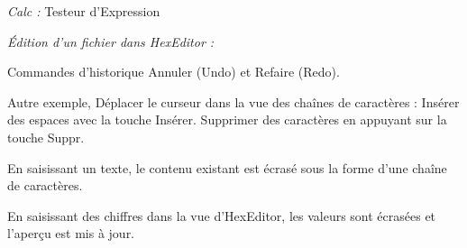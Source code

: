 \textit{Calc :}
Testeur d'Expression

\textit{Édition d'un fichier dans HexEditor :}

Commandes d'historique Annuler (Undo) et Refaire (Redo).

Autre exemple, Déplacer le curseur dans la vue des chaînes de caractères :
Insérer des espaces avec la touche Insérer.
Supprimer des caractères en appuyant sur la touche Suppr.

En saisissant un texte, le contenu existant est écrasé sous la forme d'une chaîne de caractères.

En saisissant des chiffres dans la vue d'HexEditor, les valeurs sont écrasées et l'aperçu est mis à jour.

